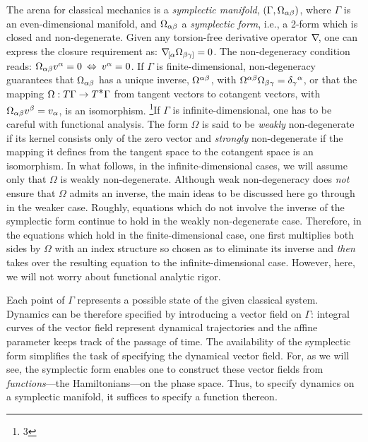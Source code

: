 The arena for classical mechanics is a {\it symplectic manifold}, $(\Gamma,
\Omega_{\alpha\beta})$, where $\Gamma$ is an even-dimensional manifold, and $\Omega_{\alpha\beta}$
a {\it symplectic form}, i.e., a 2-form which is closed and non-degenerate.
Given any torsion-free derivative operator $\nabla\! $, one can express the closure
requirement as:  $\nabla\!_{[\alpha}\Omega_{\beta\gamma]}=0$. The non-degeneracy
condition reads: $\Omega_{\alpha\beta} v^\alpha=0\>\Leftrightarrow\> v^\alpha=0$. If
$\Gamma$ is finite-dimensional, non-degeneracy guarantees that $\Omega_{\alpha\beta}$ has
a unique inverse, $\Omega^{\alpha\beta}$, with $\Omega^{\alpha\beta}\Omega_{\beta\gamma}=
\delta_\gamma{}^\alpha$, or that the mapping $\Omega: T\Gamma\rightarrow T^{\displaystyle\ast}
\Gamma$ from tangent vectors to cotangent vectors, with $\Omega_{\alpha\beta} v^\beta
=v_\alpha$, is an isomorphism.
   \footnote{3}{If $\Gamma$ is infinite-dimensional, one has to be careful
   with functional analysis. The form $\Omega$ is said to be {\it weakly}
   non-degenerate if its kernel consists only of the zero vector and
   {\it strongly} non-degenerate if the mapping it defines from the tangent
   space to the cotangent space is an isomorphism. In what follows, in the
   infinite-dimensional cases, we will assume only that $\Omega$ is weakly
   non-degenerate. Although weak non-degeneracy does {\it not} ensure that
   $\Omega$ admits an inverse, the main ideas to be discussed here
   go through in the weaker case. Roughly, equations which do not
   involve the inverse of the symplectic form continue to hold in the weakly
   non-degenerate case. Therefore, in the equations which hold in the
   finite-dimensional case, one first multiplies both sides by $\Omega$ with
   an index structure so chosen as to eliminate its inverse and {\it then}
   takes over the resulting equation to the infinite-dimensional case.
   However, here, we will not worry about functional analytic rigor.}

Each point of $\Gamma$ represents a possible state of the given classical
system. Dynamics can be therefore specified by introducing a vector field on
$\Gamma$: integral curves of the vector field represent dynamical trajectories
and the affine parameter keeps track of the passage of time. The availability
of
the symplectic form simplifies the task of specifying the dynamical vector
field. For, as we will see, the symplectic form enables one to construct
these vector fields from {\it functions}---the Hamiltonians---on the phase
space. Thus, to specify dynamics on a symplectic manifold, it suffices to
specify a function thereon.

